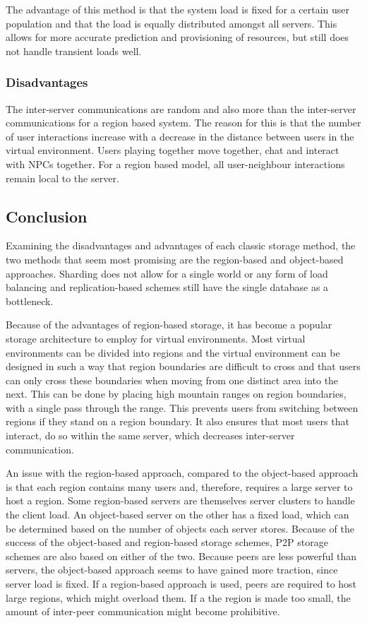 The advantage of this method is that the system load is fixed for a certain user population and that the load is equally distributed amongst all servers. This allows for more accurate prediction and provisioning of resources, but still does not handle transient loads well.

\subsubsection{Disadvantages}

The inter-server communications are random and also more than the inter-server communications for a region based system. The reason for this is that the number of user interactions increase with a decrease in the distance
between users in the virtual environment. Users playing together move together, chat and interact with NPCs together. For a region based model, all user-neighbour interactions remain local to the server.

\subsection{Conclusion}

Examining the disadvantages and advantages of each classic storage method, the two methods that seem most promising are the region-based and object-based approaches. Sharding does not allow for a single world or any form of load balancing and replication-based schemes still have the single database as a bottleneck.

Because of the advantages of region-based storage, it has become a popular storage architecture to employ for virtual environments. Most virtual environments can be divided into regions and the virtual environment can be designed in such a way that region boundaries are difficult to cross and that users can only cross these boundaries when moving from one distinct area into the next. This can be done by placing high mountain ranges on region boundaries, with a single pass through the range. This prevents users from switching between regions if they stand on a region boundary. It also ensures that most users that interact, do so within the same server, which decreases inter-server communication.

An issue with the region-based approach, compared to the object-based approach is that each region contains many users and, therefore, requires a large server to host a region. Some region-based servers are themselves server clusters to handle the client load. An object-based server on the other has a fixed load, which can be determined based on the number of objects each server stores.
Because of the success of the object-based and region-based storage schemes, P2P storage schemes are also based on either of the two. Because peers are less powerful than servers, the object-based approach seems to have gained more traction, since server load is fixed. If a region-based approach is used, peers are required to host large regions, which might overload them. If a the region is made too small, the amount of inter-peer communication might become prohibitive.

